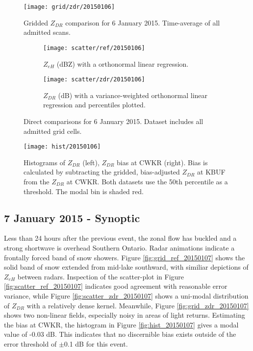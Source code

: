 \begin{figure}[H]
\texttt{[image: grid/zdr/20150106]}
\caption{Gridded $Z_{DR}$ comparison for 6 January 2015. Time-average of all admitted scans.} 
\label{fig:grid_zdr_20150106}
\end{figure}

\begin{figure}[H]
\centering
   \begin{subfigure}[t]{0.48\linewidth} \centering
     \texttt{[image: scatter/ref/20150106]}
     \caption{$Z_{eH}$ (dBZ) with a orthonormal linear regression.}\label{fig:scatter_ref_20150106}
   \end{subfigure}
   \begin{subfigure}[t]{0.48\linewidth} \centering
     \texttt{[image: scatter/zdr/20150106]}
     \caption{$Z_{DR}$ (dB) with a variance-weighted orthonormal linear regression and percentiles plotted.}\label{fig:scatter_zdr_20150106}
   \end{subfigure}
\caption{Direct comparisons for 6 January 2015. Dataset includes all admitted grid cells.} \label{fig:scatter_20150106}
\end{figure}

\begin{figure}[H]
\texttt{[image: hist/20150106]}\centering
\caption{Histograms of $Z_{DR}$ (left), $Z_{DR}$ bias at CWKR (right). Bias is calculated by subtracting the gridded, bias-adjusted $Z_{DR}$ at KBUF from the
$Z_{DR}$ at CWKR. Both datasets use the 50th percentile as a threshold. The modal bin is shaded red.} 
\label{fig:hist_20150106}
\end{figure}

\subsection{7 January 2015 - Synoptic}
Less than 24 hours after the previous event, the zonal flow has buckled and a strong shortwave is overhead Southern Ontario. Radar animations indicate a
frontally forced band of snow showers. Figure \ref{fig:grid_ref_20150107} shows the solid band of snow extended from mid-lake southward, with similiar
depictions of $Z_{eH}$ between radars. Inspection of the scatter-plot in Figure \ref{fig:scatter_ref_20150107} indicates good agreement with reasonable error
variance, while Figure \ref{fig:scatter_zdr_20150107} shows a uni-modal distribution of $Z_{DR}$ with a relatively dense kernel.
Meanwhile, Figure \ref{fig:grid_zdr_20150107} shows two non-linear fields, especially noisy in areas of light returns. 
Estimating the bias at CWKR, the histogram in Figure \ref{fig:hist_20150107} gives a modal value of -0.03 dB. This indicates that no discernible bias
exists outside of the error threshold of $\pm$0.1 dB for this event.

